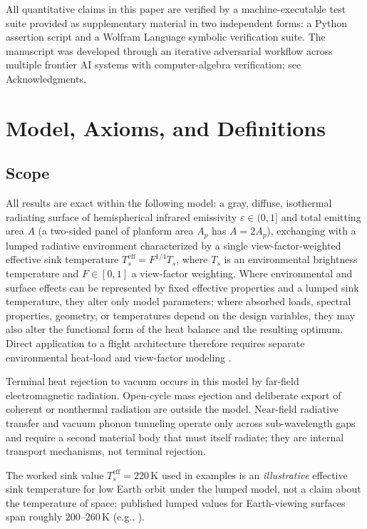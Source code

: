 \documentclass[11pt]{article}
\theoremstyle{definition}
\theoremstyle{remark}
\newcommand{\Ts}{T_s^{\mathrm{eff}}}
\newcommand{\eps}{\varepsilon}
\begin{document}
All quantitative claims in this paper are verified by a machine-executable test suite provided as supplementary material in two independent forms: a Python assertion script and a Wolfram Language symbolic verification suite. The manuscript was developed through an iterative adversarial workflow across multiple frontier AI systems with computer-algebra verification; see Acknowledgments.

\section{Model, Axioms, and Definitions}\label{sec:model}

\subsection{Scope}

All results are exact within the following model: a gray, diffuse, isothermal radiating surface of hemispherical infrared emissivity $\eps\in(0,1]$ and total emitting area $A$ (a two-sided panel of planform area $A_{p}$ has $A=2A_{p}$), exchanging with a lumped radiative environment characterized by a single view-factor-weighted effective sink temperature $\Ts=F^{1/4}T_{s}$, where $T_{s}$ is an environmental brightness temperature and $F\in[0,1]$ a view-factor weighting. Where environmental and surface effects can be represented by fixed effective properties and a lumped sink temperature, they alter only model parameters; where absorbed loads, spectral properties, geometry, or temperatures depend on the design variables, they may also alter the functional form of the heat balance and the resulting optimum. Direct application to a flight architecture therefore requires separate environmental heat-load and view-factor modeling \cite{nasaguidebook,spenvis}.

Terminal heat rejection to vacuum occurs in this model by far-field electromagnetic radiation. Open-cycle mass ejection and deliberate export of coherent or nonthermal radiation are outside the model. Near-field radiative transfer and vacuum phonon tunneling operate only across sub-wavelength gaps and require a second material body that must itself radiate; they are internal transport mechanisms, not terminal rejection.

The worked sink value $\Ts=220\,$K used in examples is an \emph{illustrative} effective sink temperature for low Earth orbit under the lumped model, not a claim about the temperature of space; published lumped values for Earth-viewing surfaces span roughly $200$--$260\,$K (e.g., \cite{nasaguidebook,spenvis}).
\end{document}
